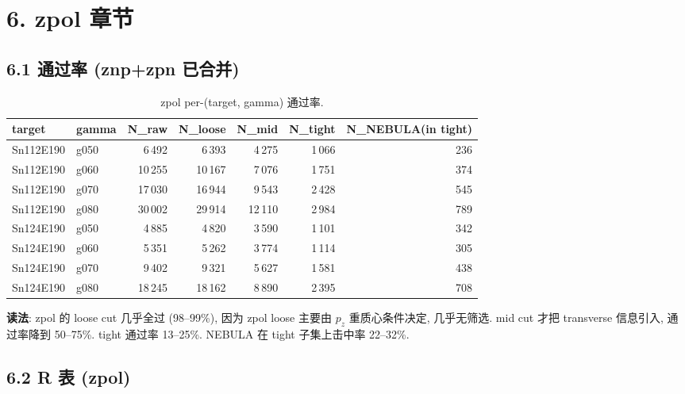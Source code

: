 \documentclass[a4paper,11pt]{article}
\begin{document}
\section{6. zpol 章节}

\subsection{6.1 通过率 (znp+zpn 已合并)}

\begin{table}[H]
\centering\footnotesize
\caption{zpol per-(target, gamma) 通过率.}
\begin{tabular}{llrrrrr}
\toprule
target & gamma & N\_raw & N\_loose & N\_mid & N\_tight & N\_NEBULA(in tight) \\
\midrule
Sn112E190 & g050 &  6\,492 &  6\,393 &  4\,275 & 1\,066 & 236 \\
Sn112E190 & g060 & 10\,255 & 10\,167 &  7\,076 & 1\,751 & 374 \\
Sn112E190 & g070 & 17\,030 & 16\,944 &  9\,543 & 2\,428 & 545 \\
Sn112E190 & g080 & 30\,002 & 29\,914 & 12\,110 & 2\,984 & 789 \\
Sn124E190 & g050 &  4\,885 &  4\,820 &  3\,590 & 1\,101 & 342 \\
Sn124E190 & g060 &  5\,351 &  5\,262 &  3\,774 & 1\,114 & 305 \\
Sn124E190 & g070 &  9\,402 &  9\,321 &  5\,627 & 1\,581 & 438 \\
Sn124E190 & g080 & 18\,245 & 18\,162 &  8\,890 & 2\,395 & 708 \\
\bottomrule
\end{tabular}
\end{table}

\textbf{读法}: zpol 的 loose cut 几乎全过 (98--99\%), 因为 zpol loose 主要由 $p_z$ 重质心条件决定, 几乎无筛选. mid cut 才把 transverse 信息引入, 通过率降到 50--75\%. tight 通过率 13--25\%. NEBULA 在 tight 子集上击中率 22--32\%.

\subsection{6.2 R 表 (zpol)}
\end{document}
